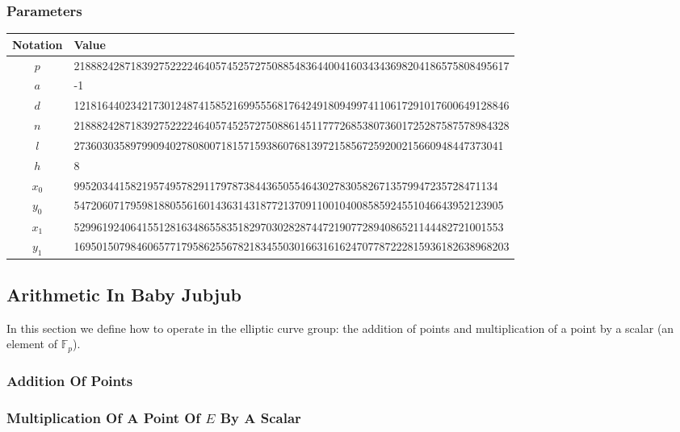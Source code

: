 \documentclass{article}
\newcommand{\Fp}{\ensuremath{\mathbb{F}_p}}
\begin{document}
\begin{spacing}{1.2}
		\subsubsection{Parameters}
			\begin {table}[h!]
				\centering
				\begin{tabular}{|c|l|}
					\hline
					{\bf Notation} & {\bf Value}\\
					\hline
					{$p$} 	&	21888242871839275222246405745257275088548364400416034343698204186575808495617 \\
					\hline
					{$a$} 	& -1 \\
					\hline
					{$d$} 	& 12181644023421730124874158521699555681764249180949974110617291017600649128846 \\
					\hline
					{$n$} 	& 21888242871839275222246405745257275088614511777268538073601725287587578984328 \\
					\hline
					{$l$} 	& 2736030358979909402780800718157159386076813972158567259200215660948447373041 \\
					\hline
					{$h$} 	& 8 \\
					\hline
					{$x_0$} & 995203441582195749578291179787384436505546430278305826713579947235728471134 \\
					\hline
					{$y_0$} & 5472060717959818805561601436314318772137091100104008585924551046643952123905 \\
					\hline
					{$x_1$} & 5299619240641551281634865583518297030282874472190772894086521144482721001553 \\
					\hline
					{$y_1$} & 16950150798460657717958625567821834550301663161624707787222815936182638968203 \\
					\hline
				\end{tabular}
				\label{tab:baby-jubjub}
			\end{table}
	
	\subsection{Arithmetic In Baby Jubjub}
		In this section we define how to operate in the elliptic curve group: %
		the addition of points and multiplication of a point by a scalar (an element of $\Fp$).
		 	\subsubsection{Addition Of Points} 
		 	\subsubsection{Multiplication Of A Point Of $E$ By A Scalar} 


\end{spacing}
\end{document}
